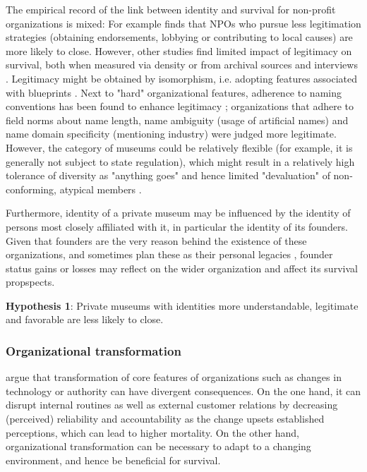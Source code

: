 \documentclass[12pt]{article}
\begin{document}
The empirical record of the link between identity and survival for non-profit organizations is mixed: 
For example \textcite{Bielefeld_1994_survival} finds that NPOs who pursue less legitimation strategies (obtaining endorsements, lobbying or contributing to local causes) are more likely to close.
However, other studies find limited impact of legitimacy on survival, both when measured via density \parencite{Bogaert_etal_2014_ecological} or from archival sources and interviews \parencite{Fernandez_2007_dissolution}.
Legitimacy might be obtained by isomorphism, i.e. adopting features associated with blueprints \parencite{diMaggio_1983_iron}.
Next to "hard" organizational features, adherence to naming conventions has been found to enhance legitimacy \parencite{Glynn_Abzug_2002_names}; organizations that adhere to field norms about name length, name ambiguity (usage of artificial names) and name domain specificity (mentioning industry) were judged more legitimate. 
However, the category of museums could be relatively flexible (for example, it is generally not subject to state regulation), which might result in a relatively high tolerance of diversity as "anything goes" and hence limited "devaluation" of non-conforming, atypical members \parencite{Bogaert_etal_2014_ecological}.


Furthermore, identity of a private museum may be influenced by the identity of persons most closely affiliated with it, in particular the identity of its founders.
Given that founders are the very reason behind the existence of these organizations, and sometimes plan these as their personal legacies \parencite{Walker_2019_collector}, founder status gains or losses may reflect on the wider organization and affect its survival propspects.


\bigbreak
\noindent
\textbf{Hypothesis 1}: Private museums with identities more understandable, legitimate and favorable are less likely to close. 



\subsubsection*{Organizational transformation}

\textcite{Carroll_Khessina_2019_demography} argue that transformation of core features of organizations such as changes in technology or authority can have divergent consequences. 
On the one hand, it can disrupt internal routines as well as external customer relations by decreasing (perceived) reliability and accountability as the change upsets established perceptions, which can lead to higher mortality. 
On the other hand, organizational transformation can be necessary to adapt to a changing environment, and hence be beneficial for survival.
\end{document}
